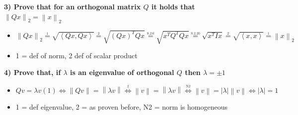 \documentclass[7pt,landscape, margin = 0.1mm]{article}
\begin{document}
\begin{multicols}{4}
\begin{flushleft}
\textbf{3) Prove that for an orthogonal matrix $Q$ it holds that $\left\|Qx \right\|_2 = \left\|x \right\|_2 $}
\begin{itemize}
\item[] $\left\|Qx \right\|_2 \overset{\underset{\mathrm{\text{1}}}{}}{=} \sqrt{\left<Qx,Qx \right>} \overset{\underset{\mathrm{\text{2}}}{}}{=} \sqrt{(Qx)^T Qx} \overset{\underset{\mathrm{\text{S.2.6}}}{}}{=} \sqrt{x^TQ^T Q x}  \overset{\underset{\mathrm{\text{S.2.20}}}{}}{=} \sqrt{x^T I x}  \overset{\underset{\mathrm{\text{2}}}{}}{=} \sqrt{\left<x,x \right>} \overset{\underset{\mathrm{\text{1}}}{}}{=} \left\|x \right\|_2  $ 
\item[] 1 = def of norm, 2 def of scalar product
\end{itemize}

\textbf{4) Prove that, if $\lambda$ is an eigenvalue of orthogonal $Q$ then $\lambda = \pm 1$ }
\begin{itemize}
\item[] $Qv = \lambda v (1) \Leftrightarrow \left\|Qv \right\| = \left\|\lambda v \right\| \overset{\underset{\mathrm{2}}{}}{\Leftrightarrow} \left\|v \right\| = \left\|\lambda v \right\| \overset{\underset{\mathrm{N2}}{}}{\Leftrightarrow}\left\|v \right\| =|\lambda| \left\| v \right\| \Leftrightarrow |\lambda| = 1$ 
\item[] 1 = def eigenvalue, 2 = as proven before, N2 = norm is homogeneous 
\end{itemize}


\end{flushleft}
\end{multicols}
\end{document}
